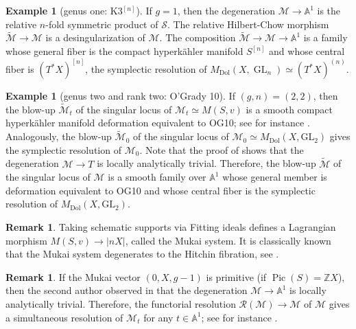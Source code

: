 \documentclass[JEP,XML,SOM,Unicode, NoEqCountersInSection,NoFloatCountersInSection,published]{cedram}
\let\mathcal\mathscr
\theoremstyle{definition}
\newtheorem{exa}[thm]{Example}
\newtheorem{rmk}[thm]{Remark}
\newcommand{\Aff}{\mathbb{A}}
\newcommand{\ZZ}{\mathbb{Z}}
\newcommand{\Gl}{\operatorname{GL}}
\newcommand{\Pic}{\operatorname{Pic}}
\newcommand{\MDolGl}{{M}_{\mathrm{Dol}}(X, \Gl_n)}
\begin{document}
\begin{exa}[genus one: K3$^{[n]}$] If $g=1$, then the degeneration $\mathcal{M}\to \Aff^1$ is the relative $n$-fold symmetric product of $\mathcal{S}$. The relative Hilbert-Chow morphism $\widetilde{\mathcal{M}}\to \mathcal{M}$ is a desingularization of $\mathcal{M}$. The composition $\widetilde{\mathcal{M}}\to \mathcal{M} \to \Aff^1$ is a family whose general fiber is the compact hyperkähler manifold $S^{[n]}$ and whose central fiber is $(T^*X)^{[n]}$, \ie the symplectic resolution of $\MDolGl \simeq (T^*X)^{(n)}$.
\end{exa}

\begin{exa}[genus two and rank two: O'Grady 10]\label{ex:OGrady10} If $(g,n)=(2,2)$, then the blow-up $\widetilde{\mathcal{M}}_t$ of the singular locus of $\mathcal{M}_t \simeq M(S,v)$ is a smooth compact hyperkähler manifold deformation equivalent to OG10; see for instance \cite{PeregoRapagnetta13}. Analogously, the blow-up $\widetilde{\mathcal{M}}_0$ of the singular locus of $\mathcal{M}_0 \simeq M_{\mathrm{Dol}}(X, \mathrm{GL}_2)$ gives the symplectic resolution of $\mathcal{M}_0$. Note that the proof of \cite[Prop.\,2.16]{PeregoRapagnetta13} shows that the degeneration $\mathcal{M}\to T$ is locally analytically trivial. Therefore, the blow-up $\widetilde{\mathcal{M}}$ of the singular locus of $\mathcal{M}$ is a smooth family over $\Aff^1$ whose general member is deformation equivalent to OG10 and whose central fiber is the symplectic resolution of $M_{\mathrm{Dol}}(X, \mathrm{GL}_2)$.
\end{exa}

\begin{rmk}\label{rmk:DEL}
Taking schematic supports via Fitting ideals defines a Lagrangian morphism $M(S, v) \to |nX|$, called the Mukai system. It is classically known that the Mukai system degenerates to the Hitchin fibration, see \cite{DEL97}.
\end{rmk}

\begin{rmk}
If the Mukai vector $(0, X, g-1)$ is primitive (\eg if $\Pic(S) = \ZZ X$), then the second author observed in \cite[Rem.\,2.5]{Mauri2021} that the degeneration $\mathcal{M}\to \Aff^1$ is locally analytically trivial. Therefore, the functorial resolution $\mathcal{R}(\mathcal{M}) \to \mathcal{M}$ of $\mathcal{M}$ gives a simultaneous resolution of $\mathcal{M}_{t}$ for any $t \in \Aff^1$; see for instance \cite[Lem.\,4.2]{Graf}.
\end{rmk}
\end{document}
